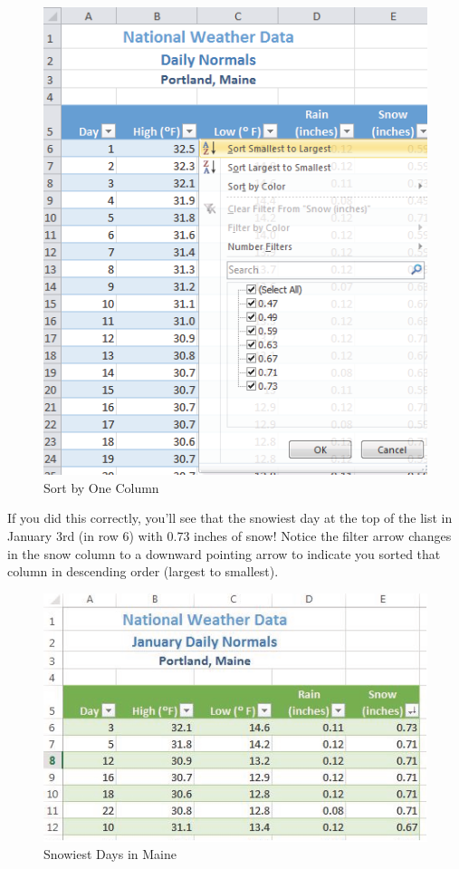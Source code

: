 \begin{figure}[H]
	\centering
	\includegraphics[width=\maxwidth{.95\linewidth}]{gfx/ch05_fig08}
	\caption{Sort by One Column}
	\label{05:fig08}
\end{figure}





If you did this correctly, you’ll see that the snowiest day at the top of the list in January 3rd (in row 6)
with 0.73 inches of snow! Notice the filter arrow changes in the snow column to a downward
pointing arrow to indicate you sorted that column in descending order (largest to smallest).


\begin{figure}[H]
	\centering
	\includegraphics[width=\maxwidth{.95\linewidth}]{gfx/ch05_fig09}
	\caption{Snowiest Days in Maine}
	\label{05:fig09}
\end{figure}






